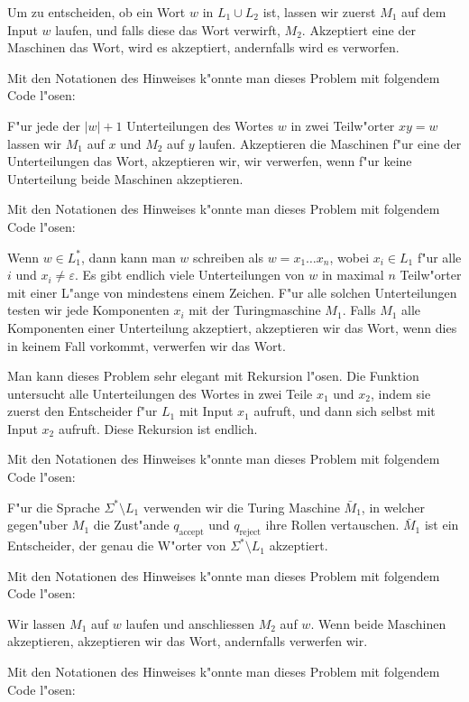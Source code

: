 \begin{loesung}
\begin{teilaufgaben}
\item Um zu entscheiden, ob ein Wort $w$ in $L_1\cup L_2$ ist,
lassen wir zuerst $M_1$ auf dem Input $w$ laufen, und falls
diese das Wort verwirft, $M_2$. Akzeptiert eine der Maschinen
das Wort, wird es akzeptiert, andernfalls wird es verworfen.

Mit den Notationen des Hinweises k"onnte man dieses Problem mit folgendem
Code l"osen:
\item
F"ur jede der $|w|+1$ Unterteilungen des Wortes $w$ in zwei
Teilw"orter $xy=w$ lassen wir $M_1$ auf $x$ und $M_2$ auf
$y$ laufen. Akzeptieren die Maschinen f"ur eine der
Unterteilungen das Wort, akzeptieren wir, wir verwerfen, wenn
f"ur keine Unterteilung beide Maschinen akzeptieren.

Mit den Notationen des Hinweises k"onnte man dieses Problem mit folgendem
Code l"osen:
\item
Wenn $w\in L_1^*$, dann kann man $w$ schreiben als
$w=x_1\dots x_n$, wobei $x_i\in L_1$ f"ur alle $i$ und
$x_i\ne \varepsilon$. Es gibt endlich viele Unterteilungen
von $w$ in maximal $n$ Teilw"orter mit einer L"ange von
mindestens einem Zeichen. F"ur alle solchen Unterteilungen
testen wir jede Komponenten $x_i$ mit der Turingmaschine
$M_1$. Falls $M_1$ alle Komponenten einer Unterteilung
akzeptiert, akzeptieren wir das Wort, wenn dies in keinem Fall
vorkommt, verwerfen wir das Wort.

Man kann dieses Problem sehr elegant mit Rekursion l"osen.
Die Funktion untersucht alle Unterteilungen des Wortes in
zwei Teile $x_1$ und $x_2$, indem sie zuerst den Entscheider
f"ur $L_1$ mit Input $x_1$ aufruft, und dann sich selbst
mit Input $x_2$ aufruft. Diese Rekursion ist endlich.

Mit den Notationen des Hinweises k"onnte man dieses Problem mit folgendem
Code l"osen:
\item
F"ur die Sprache $\Sigma^*\setminus L_1$ verwenden wir die
Turing Maschine $\bar M_1$, in welcher gegen"uber $M_1$
die Zust"ande $q_{\text{accept}}$ und $q_{\text{reject}}$
ihre Rollen vertauschen. $\bar M_1$ ist ein Entscheider,
der genau die W"orter von $\Sigma^*\setminus L_1$ akzeptiert.

Mit den Notationen des Hinweises k"onnte man dieses Problem mit folgendem
Code l"osen:
\item
Wir lassen $M_1$ auf $w$ laufen und anschliessen $M_2$ auf $w$.
Wenn beide Maschinen akzeptieren, akzeptieren wir das Wort, andernfalls
verwerfen wir.

Mit den Notationen des Hinweises k"onnte man dieses Problem mit folgendem
Code l"osen:
\end{teilaufgaben}
\end{loesung}

